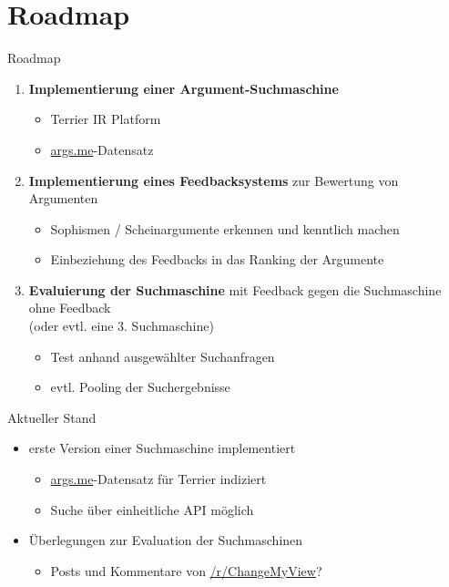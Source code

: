 \documentclass{beamer}
\begin{document}
	\section{Roadmap}
	\begin{frame}{Roadmap}
		\begin{enumerate}
			\item \textbf{Implementierung einer Argument-Suchmaschine}
			\begin{itemize}
				\item Terrier IR Platform
				\item \url{args.me}-Datensatz
			\end{itemize}
			\item \textbf{Implementierung eines Feedbacksystems} zur Bewertung von Argumenten
			\begin{itemize}
				\item Sophismen / Scheinargumente erkennen und kenntlich machen
				\item Einbeziehung des Feedbacks in das Ranking der Argumente
			\end{itemize}
			\item \textbf{Evaluierung der Suchmaschine} mit Feedback gegen die Suchmaschine ohne Feedback\\(oder evtl. eine 3. Suchmaschine)
			\begin{itemize}
				\item Test anhand ausgewählter Suchanfragen
				\item evtl. Pooling der Suchergebnisse
			\end{itemize}
		\end{enumerate}
	\end{frame}
	\begin{frame}{Aktueller Stand}
		\begin{itemize}
			\item erste Version einer Suchmaschine implementiert
			\begin{itemize}
				\item \url{args.me}-Datensatz für Terrier indiziert
				\item Suche über einheitliche API möglich
			\end{itemize}
			\item Überlegungen zur Evaluation der Suchmaschinen
			\begin{itemize}
				\item Posts und Kommentare von \url{/r/ChangeMyView}?
			\end{itemize}
		\end{itemize}
	\end{frame}
\end{document}
